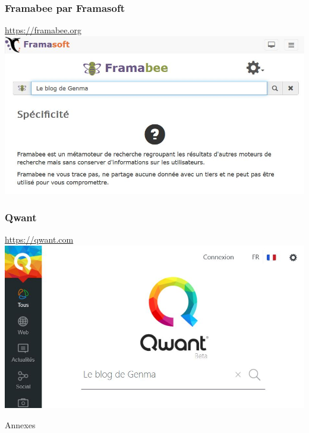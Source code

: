 \documentclass{beamer}
\begin{document}
\begin{frame}
\begin{center}
\frametitle{Framabee par Framasoft}

\url{https://framabee.org}
\\
\includegraphics[scale=0.6] {./images/Framabee.jpg}
\end{center}
\end{frame}

\begin{frame}
\begin{center}
\frametitle{Qwant}

\url{https://qwant.com}
\\
\includegraphics[scale=0.6] {./images/Qwant.jpg}
\end{center}
\end{frame}

\begin{frame}
\begin{center}
\Huge{Annexes}
\end{center}
\end{frame}
\end{document}
